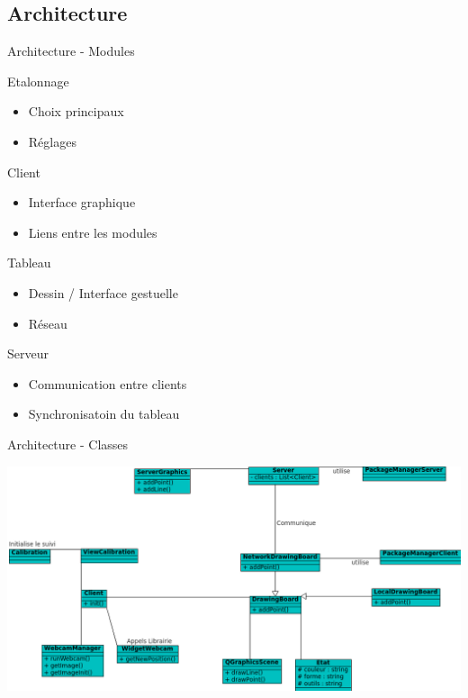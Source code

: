 \documentclass{beamer}
\begin{document}
		\subsection{Architecture}
		\begin{frame}{Architecture - Modules}
			\pause
			\begin{block}{Etalonnage}
				\begin{itemize}
					\item Choix principaux
					\item Réglages
				\end{itemize}
			\end{block}
			\pause
			\begin{block}{Client}
				\begin{itemize}
					\item Interface graphique
					\item Liens entre les modules
				\end{itemize}
			\end{block}
			\pause
			\begin{block}{Tableau}
				\begin{itemize}
					\item Dessin / Interface gestuelle
					\item Réseau
				\end{itemize}
			\end{block}
			\pause
			\begin{block}{Serveur}
				\begin{itemize}
					\item Communication entre clients
					\item Synchronisatoin du tableau
				\end{itemize}
			\end{block}
		\end{frame}
	
		\begin{frame}{Architecture - Classes}
			\begin{center}		
				\includegraphics[scale=0.45]{../uml/classes.png}
			\end{center}
		\end{frame}
		
\end{document}
